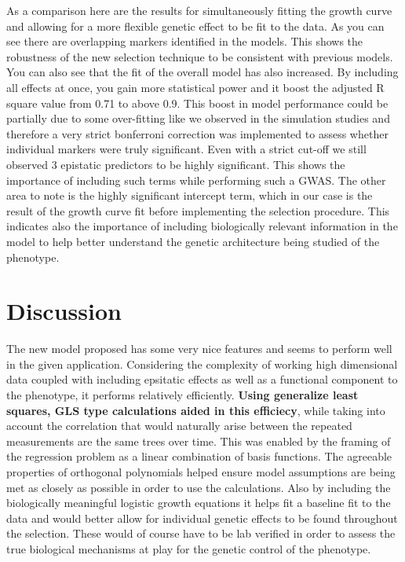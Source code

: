 \documentclass[11pt,]{book}
\theoremstyle{definition}
\theoremstyle{definition}
\theoremstyle{remark}
\begin{document}
As a comparison here are the results for simultaneously fitting the
growth curve and allowing for a more flexible genetic effect to be fit
to the data. As you can see there are overlapping markers identified in
the models. This shows the robustness of the new selection technique to
be consistent with previous models. You can also see that the fit of the
overall model has also increased. By including all effects at once, you
gain more statistical power and it boost the adjusted R square value
from 0.71 to above 0.9. This boost in model performance could be
partially due to some over-fitting like we observed in the simulation
studies and therefore a very strict bonferroni correction was
implemented to assess whether individual markers were truly significant.
Even with a strict cut-off we still observed 3 epistatic predictors to
be highly significant. This shows the importance of including such terms
while performing such a GWAS. The other area to note is the highly
significant intercept term, which in our case is the result of the
growth curve fit before implementing the selection procedure. This
indicates also the importance of including biologically relevant
information in the model to help better understand the genetic
architecture being studied of the phenotype.

\section{Discussion}\label{discussion-2}

The new model proposed has some very nice features and seems to perform
well in the given application. Considering the complexity of working
high dimensional data coupled with including epsitatic effects as well
as a functional component to the phenotype, it performs relatively
efficiently. \textbf{Using generalize least squares, GLS type
calculations aided in this efficiecy}, while taking into account the
correlation that would naturally arise between the repeated measurements
are the same trees over time. This was enabled by the framing of the
regression problem as a linear combination of basis functions. The
agreeable properties of orthogonal polynomials helped ensure model
assumptions are being met as closely as possible in order to use the
calculations. Also by including the biologically meaningful logistic
growth equations it helps fit a baseline fit to the data and would
better allow for individual genetic effects to be found throughout the
selection. These would of course have to be lab verified in order to
assess the true biological mechanisms at play for the genetic control of
the phenotype.
\end{document}
